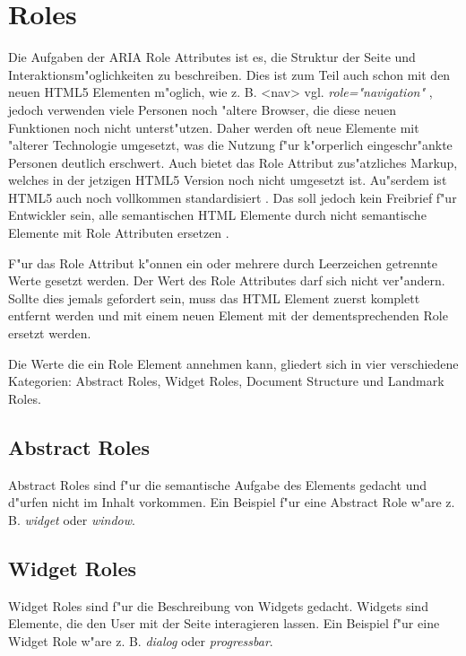 \documentclass[a4paper,bibtotoc,oneside]{scrbook}
\begin{document}
\section{Roles}
Die Aufgaben der ARIA Role Attributes ist es, die Struktur der Seite und Interaktionsm"oglichkeiten zu beschreiben. Dies ist zum Teil auch schon mit den neuen HTML5 Elementen m"oglich, wie z. B. <nav> \cite[Abschnitt 4.4.3]{html5} vgl. \emph{role="navigation"} \cite[Abschnitt 3.1]{xhtml_vocab}, jedoch verwenden viele Personen noch "altere Browser, die diese neuen Funktionen noch nicht unterst"utzen. Daher werden oft neue Elemente mit "alterer Technologie umgesetzt, was die Nutzung f"ur k"orperlich eingeschr"ankte Personen deutlich erschwert. Auch bietet das Role Attribut zus"atzliches Markup, welches in der jetzigen HTML5 Version noch nicht umgesetzt ist. Au"serdem ist HTML5 auch noch vollkommen standardisiert \cite{html5}. Das soll jedoch kein Freibrief f"ur Entwickler sein, alle semantischen HTML Elemente durch nicht semantische Elemente mit Role Attributen ersetzen \cite[Abschnitt 3]{roles}. 

F"ur das Role Attribut k"onnen ein oder mehrere durch Leerzeichen getrennte Werte gesetzt werden. Der Wert des Role Attributes darf sich nicht ver"andern. Sollte dies jemals gefordert sein, muss das HTML Element zuerst komplett entfernt werden und mit einem neuen Element mit der dementsprechenden Role ersetzt werden.\cite[Abschnitt 5]{aria_roles}

Die Werte die ein Role Element annehmen kann, gliedert sich in vier verschiedene Kategorien: Abstract Roles, Widget Roles, Document Structure und Landmark Roles. \cite[Abschnitt 5.2]{aria_states}


\subsection{Abstract Roles}
Abstract Roles sind f"ur die semantische Aufgabe des Elements gedacht und d"urfen nicht im Inhalt vorkommen. Ein Beispiel f"ur eine Abstract Role w"are z. B. \emph{widget} oder \emph{window}.\cite[Abschnitt 5.3.1]{aria_roles}

\subsection{Widget Roles}
Widget Roles sind f"ur die Beschreibung von Widgets gedacht. Widgets sind Elemente, die den User mit der Seite interagieren lassen\cite[Abschnitt 5.4, widget]{aria_roles}. Ein Beispiel f"ur eine Widget Role w"are z. B. \emph{dialog} oder \emph{progressbar}.\cite[Abschnitt 5.3.2]{aria_roles}
\end{document}
